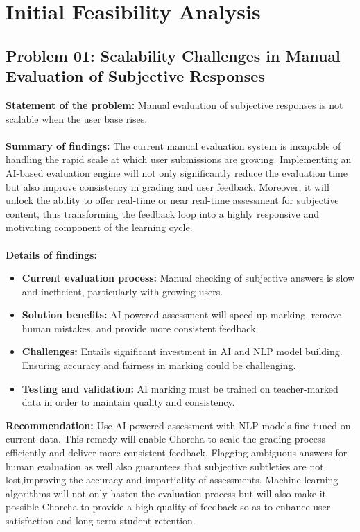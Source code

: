 \documentclass[12pt,a4paper,oneside]{book}
\begin{document}
\section{Initial Feasibility Analysis}

\subsection{Problem 01: Scalability Challenges in Manual Evaluation of Subjective Responses}
\textbf{Statement of the problem:} Manual evaluation of subjective responses is not scalable when the user base rises.\\ \\
\textbf{Summary of findings:} The current manual evaluation system is incapable of handling the rapid scale at which user submissions are growing. Implementing an AI-based evaluation engine will not only significantly reduce the evaluation time but also improve consistency in grading and user feedback. Moreover, it will unlock the ability to offer real-time or near real-time assessment for subjective content, thus transforming the feedback loop into a highly responsive and motivating component of the learning cycle.
\\ \\
\textbf{Details of findings:}
\begin{itemize}
    \item \textbf{Current evaluation process:} Manual checking of subjective answers is slow and inefficient, particularly with growing users.
    \item \textbf{Solution benefits:} AI-powered assessment will speed up marking, remove human mistakes, and provide more consistent feedback.
    \item \textbf{Challenges:} Entails significant investment in AI and NLP model building. Ensuring accuracy and fairness in marking could be challenging.

    \item \textbf{Testing and validation:} AI marking must be trained on teacher-marked data in order to maintain quality and consistency.
\end{itemize}
\textbf{Recommendation:} Use AI-powered assessment with NLP models fine-tuned on current data. This remedy will enable Chorcha to scale the grading process efficiently and deliver more consistent feedback. Flagging ambiguous answers
for human evaluation as well also guarantees that subjective subtleties are not lost,improving the accuracy and impartiality of assessments. Machine learning algorithms will not only hasten the evaluation process but will also make it possible Chorcha to provide a high quality of feedback so as to enhance user satisfaction and long-term student retention.
\end{document}
